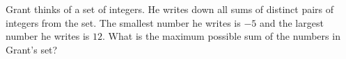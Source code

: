 Grant thinks of a set of integers. He writes down all sums of distinct pairs of integers from the set. The smallest number he writes is $-5$ and the largest number he writes is $12$. What is the maximum possible sum of the numbers in Grant's set?
